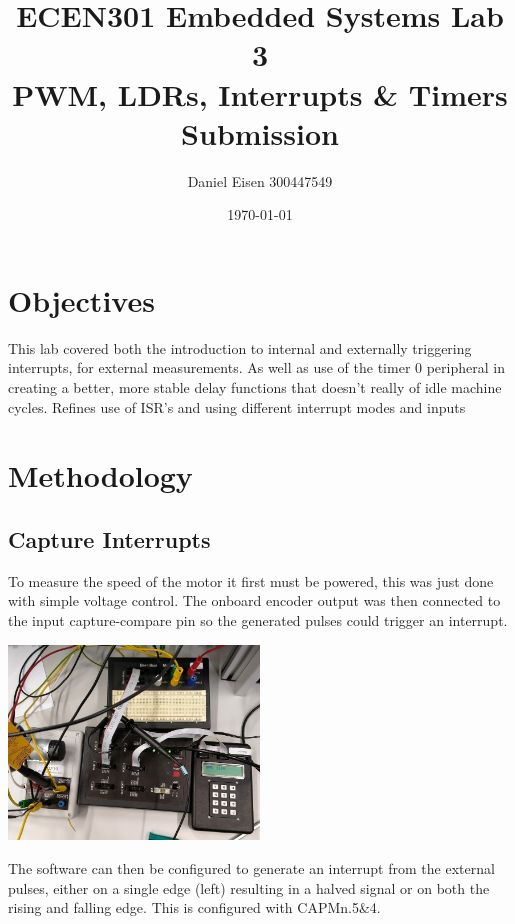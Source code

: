 \documentclass[11pt]{article}
\title{ECEN301 Embedded Systems Lab 3 \\ PWM, LDRs, Interrupts \& Timers Submission}
\author{Daniel Eisen 300447549}
\date{\today}
\begin{document}
\begin{preview}
\maketitle
\section{Objectives}
This lab covered both the introduction to internal and externally triggering interrupts, for external measurements. As well as use of the timer 0 peripheral in creating a better, more stable delay functions that doesn't really of idle machine cycles. Refines use of ISR's and using different interrupt modes and inputs

\section{Methodology}
        \subsection{Capture Interrupts}
        
        To measure the speed of the motor it first must be powered, this was just done with simple voltage control. The onboard encoder output was then connected to the input capture-compare pin so the generated pulses could trigger an interrupt.

        \begin{center}
            \includegraphics[width=0.5\textwidth]{inc/setup.jpg}
        \end{center}

        The software can then be configured to generate an interrupt from the external pulses, either on a single edge (left) resulting in a halved signal or on both the rising and falling edge. 
        This is configured with CAPMn.5\&4.


\end{preview}
\end{document}

